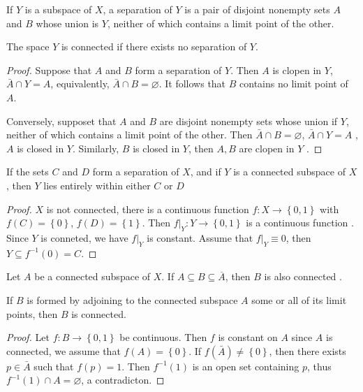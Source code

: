 \documentclass[../main.tex]{subfiles}
\begin{document}
\begin{lemma}{}{}
    If \(  Y  \) is a subspace of \(  X  \), a separation of \(  Y  \) is a pair of disjoint nonempty sets \(  A  \) and \(  B  \) whose union is \(  Y  \), neither of which contains a limit point of the other.
    
    The space \(  Y  \) is connected if there exists no separation of \(  Y  \).  
\end{lemma}
\begin{proof}
    Suppose that \(  A  \) and \(  B  \) form a separation of \(  Y  \). Then \(  A  \) is clopen in \(  Y  \), \(  \bar{A}\cap Y= A  \), equivalently, \(  \bar{A}\cap B= \varnothing  \). It follows that \(  B  \) contains no limit point of \(  A  \).
    
    Conversely, supposet that \(  A  \) and \(  B  \) are disjoint nonempty sets whose union if \(  Y  \), neither of which contains a limit point of the other. Then \(  \bar{A}\cap B= \varnothing  \), \(  \bar{A}\cap Y= A  \)     , \(  A  \) is closed in \(  Y  \). Similarly, \(  B  \) is closed in \(  Y  \), then \(  A,B  \) are clopen in \(  Y  \) .     
\end{proof}

\begin{lemma}{}{}
    If the sets \(  C  \) and \(  D  \) form a separation of \(  X  \), and if \(  Y  \) is a connected subspace of \(  X  \), then \(  Y  \) lies entirely within either \(  C  \) or \(  D  \)        
\end{lemma}

\begin{proof}
    \(  X  \) is not connected, there is a continuous function \(  f :X\to \left\{ 0,1 \right\} \) with \(  f\left( C \right)= \left\{ 0 \right\}   \), \(  f\left( D \right)= \left\{ 1 \right\}   \).    Then \(  f|_{Y} :Y\to \left\{ 0,1 \right\} \) is a continuous function . Since \(  Y  \) is conneted, we have \(  f|_{Y}  \) is constant. Assume that \(  f|_{Y}\equiv 0  \), then \(  Y\subseteq f^{-1} \left( 0 \right)= C   \).    
\end{proof}

\begin{theorem}{}{}
    Let \(  A  \) be a connected subspace of \(  X  \). If \(  A\subseteq B\subseteq  \overline{A}  \), then \(  B  \) is also connected    .
\end{theorem}
\begin{remark}
    If \(  B  \) is formed by adjoining to the connected subspace \(  A  \) some or all of its limit points, then \(  B  \) is connected.   
\end{remark}
\begin{proof}
    Let \(  f: B\to \left\{ 0,1 \right\}  \) be continuous. Then \(  f  \) is constant on \(  A  \) since \(  A  \) is connected, we assume that \(  f\left( A \right)= \left\{ 0 \right\}   \).    If \(  f\left( \bar{A} \right)\not = \left\{ 0 \right\}   \), then there exists \(  p \in \bar{A}   \) such that \(  f\left( p \right)= 1   \). Then \(  f^{-1} \left( 1 \right)   \) is an open set containing \(  p  \), thus \(  f^{-1} \left( 1 \right)\cap A= \varnothing   \), a contradicton.       
\end{proof}
\end{document}
